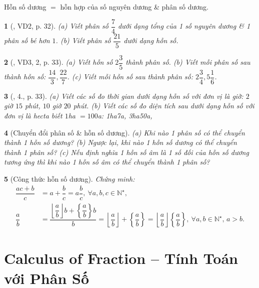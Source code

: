 \documentclass{article}
\newtheorem{baitoan}{}
\begin{document}
Hỗn số dương $=$ hỗn hợp của số nguyên dương \& phân số dương.

\begin{baitoan}[\cite{Binh_Toan_6_tap_2}, VD2, p. 32]
	(a) Viết phân số $\dfrac{7}{4}$ dưới dạng tổng của 1 số nguyên dương \& 1 phân số bé hơn $1$. (b) Viết phân số $\dfrac{21}{5}$ dưới dạng hỗn số.
\end{baitoan}

\begin{baitoan}[\cite{Binh_Toan_6_tap_2}, VD3, 2, p. 33]
	(a) Viết hỗn số $2\dfrac{3}{5}$ thành phân số. (b) Viết mỗi phân số sau thành hỗn số: $\dfrac{14}{3},\dfrac{22}{7}$. (c) Viết mỗi hỗn số sau thành phân số: $2\dfrac{3}{4},5\dfrac{1}{6}$.
\end{baitoan}

\begin{baitoan}[\cite{SGK_Toan_6_Canh_Dieu_tap_2}, 4., p. 33]
	(a) Viết các số đo thời gian dưới dạng hỗn số với đơn vị là giờ: $2$ giờ $15$ phút, $10$ giờ $20$ phút. (b) Viết các số đo diện tích sau dưới dạng hỗn số với đơn vị là hecta biết $1$\emph{ha} $= 100$\emph{a}: \emph{1ha7a, 3ha50a},
\end{baitoan}

\begin{baitoan}[Chuyển đổi phân số \& hỗn số dương]
	(a) Khi nào 1 phân số có thể chuyển thành 1 hỗn số dương? (b) Ngược lại, khi nào 1 hỗn số dương có thể chuyển thành 1 phân số? (c) Nếu định nghĩa 1 \emph{hỗn số âm} là 1 số đối của hỗn số dương tương ứng thì khi nào 1 hỗn số âm có thể chuyển thành 1 phân số?
\end{baitoan}

\begin{baitoan}[Công thức hỗn số dương]
	Chứng minh:
	\begin{align*}
		\dfrac{ac + b}{c} &= a + \dfrac{b}{c} = a\dfrac{b}{c},\ \forall a,b,c\in\mathbb{N}^\star,\\
		\dfrac{a}{b} &= \dfrac{\left\lfloor\dfrac{a}{b}\right\rfloor b + \left\{\dfrac{a}{b}\right\}b}{b} = \left\lfloor\dfrac{a}{b}\right\rfloor + \left\{\dfrac{a}{b}\right\} = \left\lfloor\dfrac{a}{b}\right\rfloor\left\{\dfrac{a}{b}\right\},\ \forall a,b\in\mathbb{N}^\star,\, a > b.
	\end{align*}
\end{baitoan}


\section{Calculus of Fraction -- Tính Toán với Phân Số}
\end{document}
